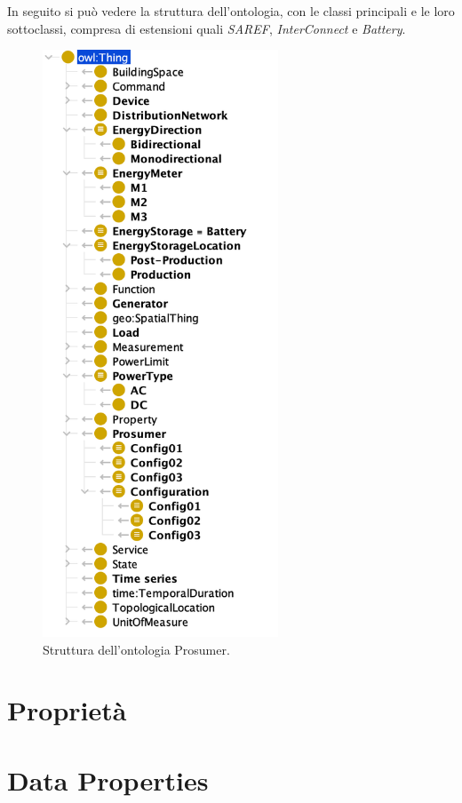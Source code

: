 In seguito si può vedere la struttura dell'ontologia, con le classi principali e le loro sottoclassi, compresa di estensioni quali \textit{SAREF}, \textit{InterConnect} e \textit{Battery}.

\begin{figure}[!ht]
    \centering
    \includegraphics[width=7cm]{images/classi_prosumer.png}
    \caption{Struttura dell'ontologia Prosumer.}
    \label{fig:classi_prosumer}
\end{figure}


\section{Proprietà}

\section{Data Properties}